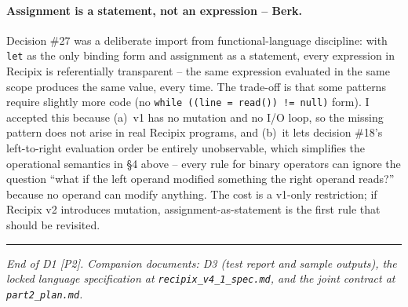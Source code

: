 \documentclass[11pt,a4paper]{article}
\begin{document}
\paragraph{Assignment is a statement, not an expression -- Berk.}
Decision \#27 was a deliberate import from functional-language
discipline: with \texttt{let} as the only binding form and assignment
as a statement, every expression in Recipix is referentially
transparent -- the same expression evaluated in the same scope
produces the same value, every time. The trade-off is that some
patterns require slightly more code (no \texttt{while ((line =
read()) != null)} form). I accepted this because (a)~v1 has no
mutation and no I/O loop, so the missing pattern does not arise in
real Recipix programs, and (b)~it lets decision \#18's left-to-right
evaluation order be entirely unobservable, which simplifies the
operational semantics in \S4 above -- every rule for binary
operators can ignore the question ``what if the left operand modified
something the right operand reads?'' because no operand can modify
anything. The cost is a v1-only restriction; if Recipix v2
introduces mutation, assignment-as-statement is the first rule that
should be revisited.

\vfill
\noindent\rule{\textwidth}{0.4pt}
\begin{center}
\small
\emph{End of D1 [P2]. Companion documents: D3 (test report and
sample outputs), the locked language specification at
\texttt{recipix\_v4\_1\_spec.md}, and the joint contract at
\texttt{part2\_plan.md}.}
\end{center}
\end{document}
